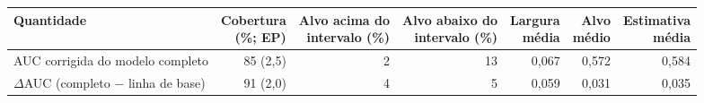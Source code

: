 \begin{tabular}{lrrrrrr}
\toprule
Quantidade & \makecell[r]{Cobertura\\(\%; EP)} & \makecell[r]{Alvo acima do\\intervalo (\%)} & \makecell[r]{Alvo abaixo do\\intervalo (\%)} & \makecell[r]{Largura\\média} & \makecell[r]{Alvo\\médio} & \makecell[r]{Estimativa\\média} \\
\midrule
AUC corrigida do modelo completo & 85 (2,5) & 2 & 13 & 0,067 & 0,572 & 0,584 \\
$\Delta$AUC (completo $-$ linha de base) & 91 (2,0) & 4 & 5 & 0,059 & 0,031 & 0,035 \\
\bottomrule
\end{tabular}
